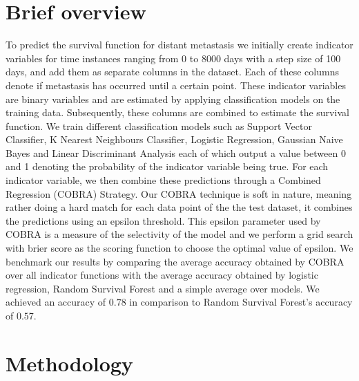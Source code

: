 \documentclass[13pt]{article}
\begin{document}
\section{Brief overview}
To predict the survival function for distant metastasis we initially create indicator variables for time instances ranging from 0 to 8000 days with a step size of 100 days, and add them as separate columns in the dataset. Each of these columns denote if metastasis has occurred until a certain point. These indicator variables are binary variables and are estimated by applying classification models on the training data. Subsequently, these columns are combined to estimate the survival function. We train different classification models such as Support Vector Classifier, K Nearest Neighbours Classifier, Logistic Regression, Gaussian Naive Bayes and Linear Discriminant Analysis each of which output a value between 0 and 1 denoting the probability of the indicator variable being true. For each indicator variable, we then combine these predictions through a Combined Regression (COBRA) Strategy. Our COBRA technique is soft in nature, meaning rather doing a hard match for each data point of the the test dataset, it combines the predictions using an epsilon threshold. This epsilon parameter used by COBRA is a measure of the selectivity of the model and we perform a grid search with brier score as the scoring function to choose the optimal value of epsilon. We benchmark our results by comparing the average accuracy obtained by COBRA over all indicator functions with the average accuracy obtained by logistic regression, Random Survival Forest and a simple average over models. We achieved an accuracy of $0.78$ in comparison to Random Survival Forest's accuracy of $0.57$.
\section{Methodology}
\end{document}
